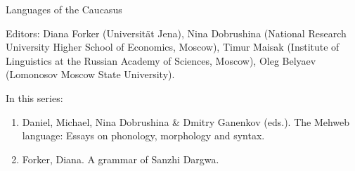 {\large Languages of the Caucasus}

\bigskip
 
Editors:        Diana Forker (Universität Jena),
    Nina Dobrushina (National Research University Higher School of Economics, Moscow),
    Timur Maisak (Institute of Linguistics at the Russian Academy of Sciences, Moscow),
    Oleg Belyaev (Lomonosov Moscow State University).

\bigskip

In this series:

\begin{enumerate}
\item Daniel, Michael, Nina Dobrushina \& Dmitry Ganenkov (eds.). The Mehweb
language: Essays on phonology, morphology and syntax.
\item Forker, Diana. A grammar of Sanzhi Dargwa.

\end{enumerate}


\vfill

